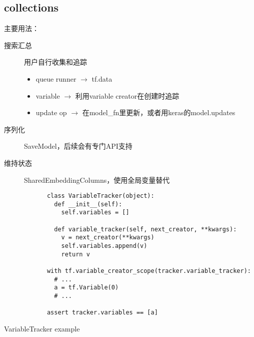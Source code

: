 
\subsection{collections}

\begin{frame}
    主要用法：
    \begin{description}
        \item[搜索汇总]  用户自行收集和追踪
            \begin{itemize}
                \item queue runner $\to$ tf.data
                \item variable $\to$ 利用variable creator在创建时追踪
                \item update op $\to$ 在model\_fn里更新，或者用keras的model.updates
            \end{itemize}
        \item[序列化]    SaveModel，后续会有专门API支持
        \item[维持状态]  SharedEmbeddingColumns，使用全局变量替代
    \end{description}
\end{frame}

\begin{frame}[fragile]
    \begin{listing}[H]
        \begin{verbatim}
            class VariableTracker(object):
              def __init__(self):
                self.variables = []

              def variable_tracker(self, next_creator, **kwargs):
                v = next_creator(**kwargs)
                self.variables.append(v)
                return v

            with tf.variable_creator_scope(tracker.variable_tracker):
              # ...
              a = tf.Variable(0)
              # ...

            assert tracker.variables == [a]
        \end{verbatim}
        \caption{VariableTracker example}
    \end{listing}
\end{frame}
